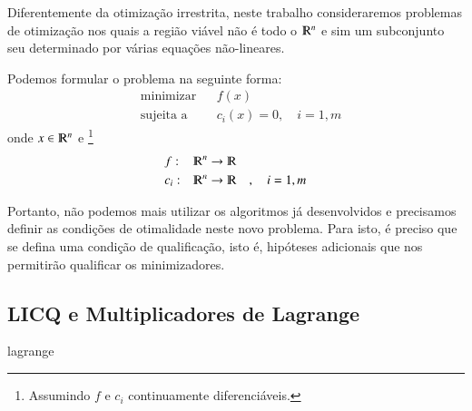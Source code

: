 Diferentemente da otimização irrestrita, neste trabalho consideraremos problemas de
otimização nos quais a região viável não é todo o $\varmathbb{R}^n$ e sim um subconjunto
seu determinado por várias equações não-lineares.

Podemos formular o problema na seguinte forma:
\begin{equation}
    \label{eq:problema}
    \begin{aligned}
        & \text{minimizar} & & f(x) \\
        & \text{sujeita a} & & c_i(x) = 0, \quad i = 1, m
    \end{aligned}
\end{equation}
onde $x  \in \varmathbb{R}^n $ e \footnote{Assumindo $f$ e $c_i$ continuamente diferenciáveis.}
\begin{equation*}
    \begin{aligned}
        & f: & \varmathbb{R}^n \rightarrow \varmathbb{R} & &  \\
        & c_i: & \varmathbb{R}^n \rightarrow \varmathbb{R} & & ,\quad  i = 1, m
    \end{aligned}
\end{equation*}

Portanto, não podemos mais utilizar os algoritmos já desenvolvidos e precisamos
definir as condições de otimalidade neste novo problema. Para isto, é preciso
que se defina uma condição de qualificação, isto é, hipóteses adicionais que nos
permitirão qualificar os minimizadores.

\newpage
\subsection{LICQ e Multiplicadores de Lagrange}
    {lagrange}
